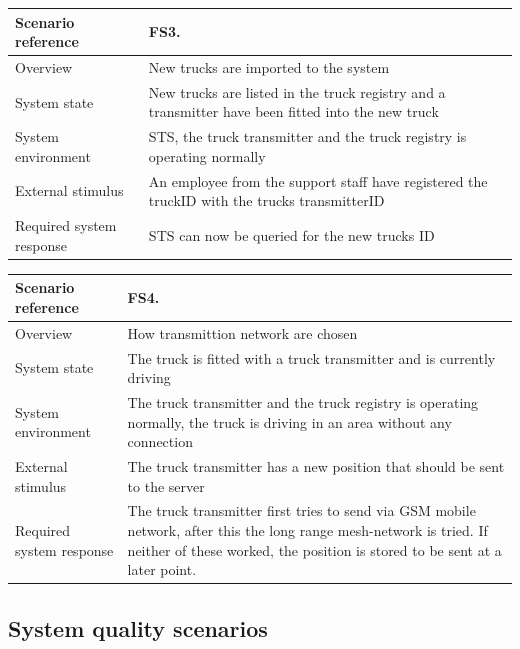 \documentclass[a4paper,11pt]{report}
\begin{document}
\begin{center}
  \begin{tabular}[h!]{| >{\columncolor{gray}}p{} | p{} |}
    \hline
    Scenario reference & FS3. \\
    \hline
    Overview & New trucks are imported to the system \\
    \hline
    System state & New trucks are listed in the truck registry and a transmitter have been fitted into the new truck\\
    \hline
    System environment & STS, the truck transmitter and the truck registry is operating normally\\
    \hline
    External stimulus & An employee from the support staff have registered the truckID with the trucks transmitterID \\
    \hline
    Required system response & STS can now be queried for the new trucks ID \\
    \hline
  \end{tabular}
\end{center}

\begin{center}
  \begin{tabular}[h!]{| >{\columncolor{gray}}p{} | p{} |}
    \hline
    Scenario reference & FS4. \\
    \hline
    Overview & How transmittion network are chosen \\
    \hline
    System state & The truck is fitted with a truck transmitter and is currently driving\\
    \hline
    System environment & The truck transmitter and the truck registry is operating normally, the truck is driving in an area without any connection\\
    \hline
    External stimulus & The truck transmitter has a new position that should be sent to the server \\
    \hline
    Required system response & The truck transmitter first tries to send via GSM mobile network, after this the long range mesh-network is tried. If neither of these worked, the position is stored to be sent at a later point. \\
    \hline
  \end{tabular}
\end{center}

\subsection{System quality scenarios}
\label{sec:syst-qual-scen}
\end{document}
